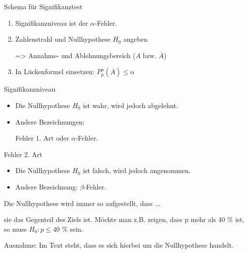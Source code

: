\documentclass[paper=a6,landscape,ngerman,twoside=true,fontsize=12pt]{scrartcl}
\begin{document}
\begin{frage}
	Schema für Signifikanztest
	
\end{frage}
\begin{antwort}
	\begin{enumerate}
		\item Signifikanzniveau ist der $\alpha$-Fehler.
		\item Zahlenstrahl und Nullhypothese $H_0$ angeben
		
		=> Annahme- und Ablehnungsbereich  ($A \text{ bzw. }\overline{A}$)			
			
		\item In Lückenformel einsetzen: $P^n_p(\overline{A})\leq\alpha$	
	\end{enumerate}	
\end{antwort}	
\begin{frage}
	Signifikanzniveau
	
\end{frage}
\begin{antwort}
	\begin{itemize}
		\item Die Nullhypothese $H_0$ ist wahr, wird jedoch abgelehnt.
		\item Andere Bezeichnungen: 
		
		Fehler 1. Art oder $\alpha$-Fehler.	
	\end{itemize}	
\end{antwort}
\begin{frage}
	Fehler 2. Art
	
\end{frage}
\begin{antwort}
	\begin{itemize}
		\item Die Nullhypothese $H_0$ ist falsch, wird jedoch angenommen.
		\item Andere Bezeichnung: $\beta$-Fehler.	
	\end{itemize}	
\end{antwort}	
\begin{frage}
	Die Nullhypothese wird immer so aufgestellt, dass ...
	
\end{frage}
\begin{antwort}
	sie das Gegenteil des Ziels ist. Möchte man z.B. zeigen, dass p mehr als 40 $\%$ ist,
	so muss $H_0: p \le 40$ $\%$ sein.
	
	Ausnahme: Im Text steht, dass es sich hierbei um die Nullhypothese handelt.
\end{antwort}	
\end{document}
